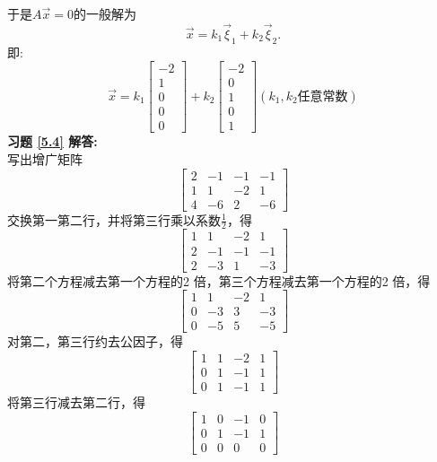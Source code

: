 \documentclass[a4paper]{book}
\begin{document}
于是$A\vec{x}=0$的一般解为
\begin{equation*}
\vec{x}=k_1\vec{\xi}_1+k_2\vec{\xi}_2.
\end{equation*}
即:
\begin{equation*}
\vec{x}=k_1\begin{bmatrix}-2\\1\\0\\0\\0\end{bmatrix}+
k_2\begin{bmatrix}-2\\0\\1\\0\\1\end{bmatrix} (k_1,k_2\text{任意常数})
\end{equation*}
\textbf{习题 \ref{5.4} 解答:}\\
写出增广矩阵
\begin{equation*}
\begin{bmatrix}
2&-1&-1&-1\\1&1&-2&1\\4&-6&2&-6
\end{bmatrix}
\end{equation*}
交换第一第二行，并将第三行乘以系数$\frac{1}{2}$，得
\begin{equation*}
\begin{bmatrix}
1&1&-2&1\\
2&-1&-1&-1\\
2&-3&1&-3
\end{bmatrix}
\end{equation*}
将第二个方程减去第一个方程的2 倍，第三个方程减去第一个方程的2 倍，得
\begin{equation*}
\begin{bmatrix}
1&1&-2&1\\
0&-3&3&-3\\
0&-5&5&-5
\end{bmatrix}
\end{equation*}
对第二，第三行约去公因子，得
\begin{equation*}
\begin{bmatrix}
1&1&-2&1\\
0&1&-1&1\\
0&1&-1&1
\end{bmatrix}
\end{equation*}
将第三行减去第二行，得
\begin{equation*}
\begin{bmatrix}
1&0&-1&0\\
0&1&-1&1\\
0&0&0&0
\end{bmatrix}
\end{equation*}
\end{document}
